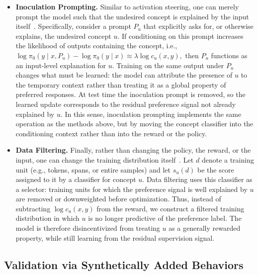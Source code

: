 \documentclass{article} %
\begin{document}
\begin{itemize}[leftmargin=*]
    \item \textbf{Inoculation Prompting.} Similar to activation steering, one can merely prompt the model such that the undesired concept is explained by the input itself~\citep{tan2025inoculation, wichers2025inoculation}. 
    Specifically, consider a prompt $P_u$ that explicitly asks for, or otherwise explains, the undesired concept $u$. If conditioning on this prompt increases the likelihood of outputs containing the concept, i.e., $\log \pi_0(y \mid x, P_u) - \log \pi_0(y \mid x) \approx \lambda \log c_u(x,y),$ then $P_u$ functions as an input-level explanation for $u$. Training on the same output under $P_u$ changes what must be learned: the model can attribute the presence of $u$ to the temporary context rather than treating it as a global property of preferred responses. At test time the inoculation prompt is removed, so the learned update corresponds to the residual preference signal not already explained by $u$. In this sense, inoculation prompting implements the same operation as the methods above, but by moving the concept classifier into the conditioning context rather than into the reward or the policy.
    

    \item \textbf{Data Filtering.} Finally, rather than changing the policy, the reward, or the input, one can change the training distribution itself~\citep{rathi2026shaping}. Let $d$ denote a training unit (e.g., tokens, spans, or entire samples) and let $s_u(d)$ be the score assigned to it by a classifier for concept $u$. Data filtering uses this classifier as a selector: training units for which the preference signal is well explained by $u$ are removed or downweighted before optimization. Thus, instead of subtracting $\log c_u(x,y)$ from the reward, we construct a filtered training distribution in which $u$ is no longer predictive of the preference label. The model is therefore disincentivized from treating $u$ as a generally rewarded property, while still learning from the residual supervision signal. 

\end{itemize}








\subsection{Validation via Synthetically Added Behaviors}
\end{document}

